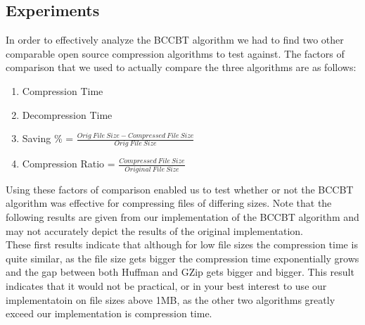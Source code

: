 \documentclass[12pt]{IEEEtran}
\begin{document}
\subsection{Experiments}
In order to effectively analyze the BCCBT algorithm we had to 
find two other comparable open source compression algorithms to test against. 
The factors of comparison that we used to actually compare the three algorithms are as follows:
\begin{enumerate}
	\item Compression Time
	\item Decompression Time
   	\item Saving \% = $\frac{Orig\ File\ Size - Compressed\ File\ Size}{Orig\ File\ Size}$
    	\item Compression Ratio = $\frac{Compressed\ File\ Size}{Original\ File\ Size}$
\end{enumerate}
Using these factors of comparison enabled us to test whether or not the BCCBT algorithm was effective 
for compressing files of differing sizes. Note that the following results are given from our implementation
of the BCCBT algorithm and may not accurately depict the results of the original implementation.
\\
These first results indicate that although for low file sizes the compression time is quite similar,
as the file size gets bigger the compression time exponentially grows and the gap between
both Huffman and GZip gets bigger and bigger. This result indicates that
it would not be practical, or in your best interest to use our implementatoin on file sizes above 1MB,
as the other two algorithms greatly exceed our implementation is compression time. \\
\end{document}
